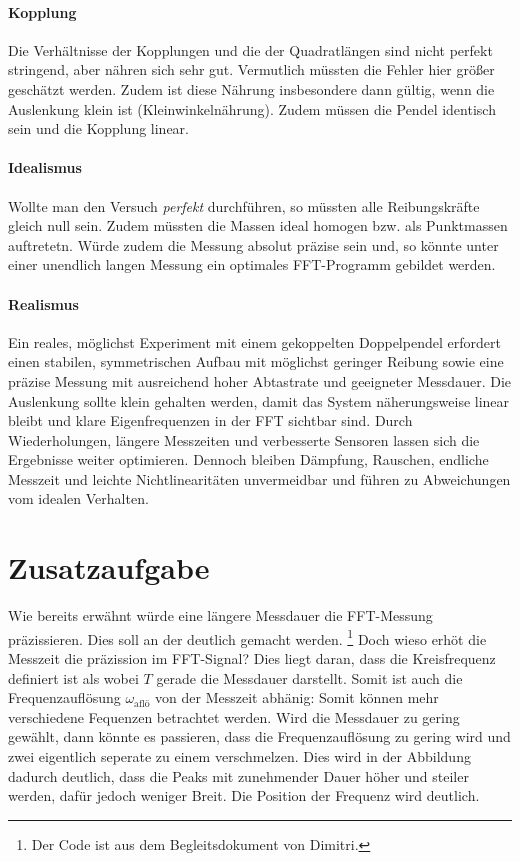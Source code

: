 \paragraph{Kopplung}
Die Verhältnisse der Kopplungen und die der Quadratlängen sind nicht perfekt stringend, aber nähren sich sehr gut. Vermutlich müssten die Fehler hier größer geschätzt werden. Zudem ist diese Nährung insbesondere dann gültig, wenn die Auslenkung klein ist (Kleinwinkelnährung). 
Zudem müssen die Pendel identisch sein und die Kopplung linear.

\paragraph{Idealismus}
Wollte man den Versuch \emph{perfekt} durchführen, so müssten alle Reibungskräfte gleich null sein. Zudem müssten die Massen ideal homogen bzw. als Punktmassen auftretetn. Würde zudem die Messung absolut präzise sein und, so könnte unter einer unendlich langen Messung ein optimales FFT-Programm gebildet werden.  

\paragraph{Realismus}
Ein reales, möglichst Experiment mit einem gekoppelten Doppelpendel erfordert einen stabilen, symmetrischen Aufbau mit möglichst geringer Reibung sowie eine präzise Messung mit ausreichend hoher Abtastrate und geeigneter Messdauer. Die Auslenkung sollte klein gehalten werden, damit das System näherungsweise linear bleibt und klare Eigenfrequenzen in der FFT sichtbar sind. Durch Wiederholungen, längere Messzeiten und verbesserte Sensoren lassen sich die Ergebnisse weiter optimieren. Dennoch bleiben Dämpfung, Rauschen, endliche Messzeit und leichte Nichtlinearitäten unvermeidbar und führen zu Abweichungen vom idealen Verhalten.

\section{Zusatzaufgabe}
\label{sec:extraBlatt}
Wie bereits erwähnt würde eine längere Messdauer die FFT-Messung präzissieren. Dies soll an der  deutlich gemacht werden. \footnote{Der Code ist aus dem Begleitsdokument von Dimitri.} \cite{DimiOverKill}
Doch wieso erhöt die Messzeit die präzission im FFT-Signal? Dies liegt daran, dass die Kreisfrequenz definiert ist als
wobei $T$ gerade die Messdauer darstellt. Somit ist auch die Frequenzauflösung $\omega_\text{aflö}$ von der Messzeit abhänig:
Somit können mehr verschiedene Fequenzen betrachtet werden. Wird die Messdauer zu gering gewählt, dann könnte es passieren, dass die Frequenzauflösung zu gering wird und zwei eigentlich seperate zu einem verschmelzen.
Dies wird in der Abbildung dadurch deutlich, dass die Peaks mit zunehmender Dauer höher und steiler werden, dafür jedoch weniger Breit. Die Position der Frequenz wird deutlich.



